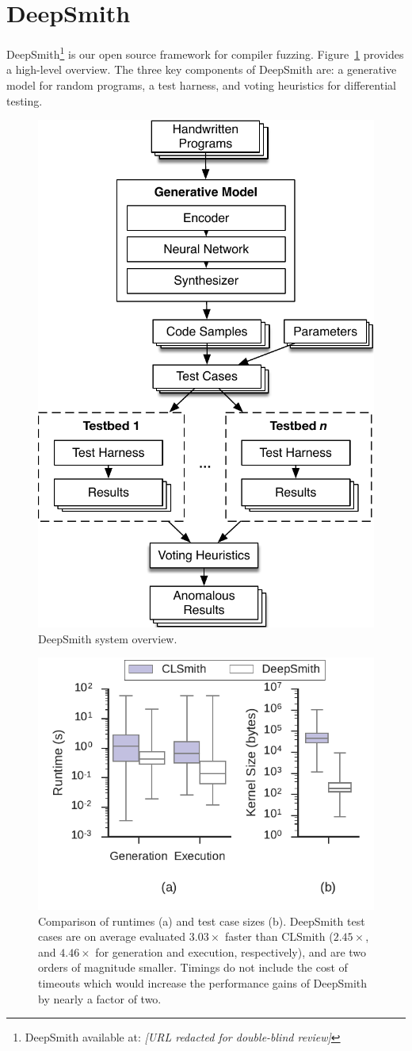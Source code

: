 \section{DeepSmith}

DeepSmith\footnote{DeepSmith available at: \emph{[URL redacted for double-blind review]}} is our open source framework for compiler fuzzing. Figure~\ref{fig:deeptune} provides a high-level overview. The three key components of DeepSmith are: a generative model for random programs, a test harness, and voting heuristics for differential testing.

\begin{figure}
  \centering
  \includegraphics[width=.45\columnwidth]{img/deepsmith} %
  \caption{%
    DeepSmith system overview.
    \vspace{-1.1em}
  }%
  \label{fig:deeptune}
\end{figure}

\begin{figure}
	\centering %
	\includegraphics[width=.45\columnwidth]{build/img/vs-clsmith}%
	\vspace{-1em}
	\caption{%
		Comparison of runtimes (a) and test case sizes (b). DeepSmith test cases are on average evaluated $3.03\times$ faster than CLSmith ($2.45\times$, and $4.46\times$ for generation and execution, respectively), and are two orders of magnitude smaller. Timings do not include the cost of timeouts which would increase the performance gains of DeepSmith by nearly a factor of two.
	}%
	\vspace{-1.3em}
	\label{fig:vs-clsmith} %
\end{figure}


